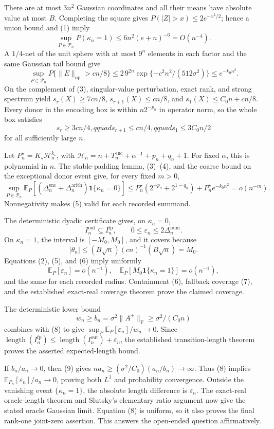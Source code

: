 There are at most \(3n^2\) Gaussian coordinates and all their means have
absolute value at most \(B\).  Completing the square gives
\(P(|Z|>x)\le2e^{-x^2/2}\); hence a union bound and (1) imply
\[
\sup_{P\in\mathcal P_n}P(\kappa_n=1)
\le6n^2(e+n)^{-6}=O(n^{-4}).                                         \tag{2}
\]
A \(1/4\)-net of the unit sphere with at most \(9^n\) elements in each factor
and the same Gaussian tail bound give
\[
\sup_{P\in\mathcal P_n}P\{\|E\|_{
\mathrm{op}}>cn/8\}
\le2\,9^{2n}\exp\{-c^2n^2/(512\sigma^2)\}
\le e^{-k_0n^2}.                                                       \tag{3}
\]
On the complement of (3), singular-value perturbation, exact rank, and strong
spectrum yield
\(s_r(X)\ge7cn/8\), \(s_{r+1}(X)\le cn/8\), and
\(s_1(X)\le C_0n+cn/8\).  Every donor in the encoding box is within
\(n2^{-p_n}\) in operator norm, so the whole box satisfies
\[
s_r\ge3cn/4,qquad s_{r+1}\le cn/4,qquad s_1\le3C_0n/2              \tag{4}
\]
for all sufficiently large \(n\).

Let \(P_n^\star=K_\star\mathcal H_n^{k_\star}\), with
\(\mathcal H_n=n+T_n^{\mathrm{enc}}+\alpha^{-1}+p_n+q_n+1\).  For fixed
\(\alpha\), this is polynomial in \(n\).  The stable-padding lemma, (3)--(4),
and the coarse bound on the exceptional donor event give, for every fixed
\(m>0\),
\[
\sup_{P\in\mathcal P_n}\mathbb E_P[
(\Delta_n^{\mathrm{enc}}+\Delta_n^{\mathrm{arith}})
\mathbf1\{\kappa_n=0\}]
\le P_n^\star(2^{-p_n}+2^{1-q_n})+P_n^\star e^{-k_0n^2}
=o(n^{-m}).                                                           \tag{5}
\]
Nonnegativity makes (5) valid for each recorded summand.

The deterministic dyadic certificate gives, on \(\kappa_n=0\),
\[
I_n^{\mathrm{out}}\subseteq I_n^{\mathrm{fp}},
\qquad0\le\varepsilon_n\le2\Delta_n^{\mathrm{num}}.                 \tag{6}
\]
On \(\kappa_n=1\), the interval is \([-M_0,M_0]\), and it covers because
\[
|\theta_n|\le(B\sqrt n)(cn)^{-1}(B\sqrt n)=M_0.                      \tag{7}
\]
Equations (2), (5), and (6) imply uniformly
\[
\mathbb E_P[\varepsilon_n]=o(n^{-1}),
\quad
\mathbb E_P[M_0\mathbf1\{\kappa_n=1\}]=o(n^{-1}),                  \tag{8}
\]
and the same for each recorded radius.  Containment (6), fallback coverage (7),
and the established exact-real coverage theorem prove the claimed coverage.

The deterministic lower bound
\[
w_n\ge b_n=\sigma^2\|A^+\|_{
\mathrm F}\ge\sigma^2/(C_0n)                                       \tag{9}
\]
combines with (8) to give
\(\sup_P\mathbb E_P[\varepsilon_n]/w_n\to0\).  Since
\(\operatorname{length}(I_n^{\mathrm{fp}})\le
\operatorname{length}(I_n^{\mathrm{out}})+\varepsilon_n\), the established
transition-length theorem proves the asserted expected-length bound.

If \(b_n/a_n\to0\), then (9) gives
\(na_n\ge(\sigma^2/C_0)(a_n/b_n)\to\infty\).  Thus (8) implies
\(\mathbb E_{P_n}[\varepsilon_n]/a_n\to0\), proving both \(L^1\) and
probability convergence.  Outside the vanishing event \(\{\kappa_n=1\}\), the
absolute length difference is \(\varepsilon_n\).  The exact-real oracle-length
theorem and Slutsky's elementary ratio argument now give the stated oracle
Gaussian limit.  Equation (8) is uniform, so it also proves the final rank-one
joint-zero assertion.  This answers the open-ended question affirmatively.
